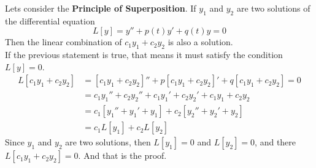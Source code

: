 Lets consider the \textbf{Principle of Superposition}. If $ y_1 $ and $ y_2 $ are two solutions of the differential equation
\[ L[y] = y'' + p(t)y' + q(t)y = 0 \]
Then the linear combination of $ c_1 y_1 + c_2 y_2 $ is also a solution.\\
If the previous statement is true, that means it must satisfy the condition $ L[y] = 0 $.
\begin{align*}
	L[c_1 y_1 + c_2 y_2 ] &= [c_1 y_1 + c_2 y_2 ]'' + p[c_1 y_1 + c_2 y_2 ]' + q[c_1 y_1 + c_2 y_2 ] = 0 \\
	&= c_1y_1'' + c_2y_2'' + c_1y_1' + c_2y_2' + c_1y_1 + c_2y_2 \\
	&= c_1[y_1'' + y_1' + y_1] + c_2[y_2'' + y_2' + y_2]\\
	&= c_1L[y_1] + c_2L[y_2]
\end{align*}
Since $ y_1 $ and $ y_2 $ are two solutions, then $ L[y_1] =0 $ and $ L[y_2] =0 $, and there $ L[c_1 y_1 + c_2 y_2 ] = 0$. And that is the proof. 

